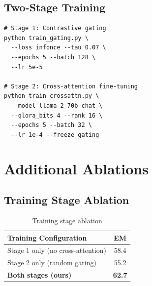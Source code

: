 \documentclass[10pt,twocolumn]{article}
\begin{document}
\subsection{Two-Stage Training}
\begin{verbatim}
# Stage 1: Contrastive gating
python train_gating.py \
  --loss infonce --tau 0.07 \
  --epochs 5 --batch 128 \
  --lr 5e-5

# Stage 2: Cross-attention fine-tuning
python train_crossattn.py \
  --model llama-2-70b-chat \
  --qlora_bits 4 --rank 16 \
  --epochs 5 --batch 32 \
  --lr 1e-4 --freeze_gating
\end{verbatim}

\section{Additional Ablations}
\label{app:ablations}

\subsection{Training Stage Ablation}

\begin{table}[h]
\centering
\caption{Training stage ablation}
\small
\begin{tabular}{@{}lc@{}}
\toprule
\textbf{Training Configuration} & \textbf{EM} \\
\midrule
Stage 1 only (no cross-attention) & 58.4 \\
Stage 2 only (random gating) & 55.2 \\
\textbf{Both stages (ours)} & \textbf{62.7} \\
\bottomrule
\end{tabular}
\end{table}
\end{document}
